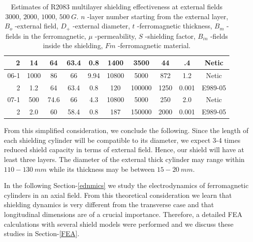 \documentclass[12pt]{article}
\begin{document}
\begin{table}[htbp]
\begin{center}
\begin{tabular}{|r|c|c|c|c|c|c|c|c|c|}
   2    & 14  & 64  & 63.4& 0.8  & 1400  & 3500       & 44   & .4               & Netic    \\ \hline \hline
 06-1    & 1000& 86  & 66  & 9.94 & 10800 & 5000       & 872  & 1.2    & Netic    \\ \hline
    2    & 1.2 & 64  & 63.4& 0.8  &  120  & 100000     & 1250 & 0.001  & E989-05  \\ \hline \hline
 07-1    & 500 & 74.6& 66  & 4.3  & 10800 & 5000       & 250  & 2.0    & Netic    \\ \hline
    2    & 2.0 & 60  & 58.4& 0.8  & 187   & 150000     & 2000 & 0.001  & E989-05  \\ \hline
\end{tabular}
\end{center}
\caption{Estimates of R2083 multilayer  shielding effectiveness at
 external fields  $3000$, $2000$, $1000$, $500~G$.
 $n$
-layer number starting from the external layer,
 $B_{o}$
-external field,
$D_+$
-external diameter,
$t$
-ferromagnetic thickness,
$B_m$
 -fields in the ferromagnetic, 
$\mu$
-permeability,
$S$
-shielding factor, 
$B_{in}$
-fields inside the shielding,
$Fm$
-ferromagnetic material.
\label{cal2}}
\end{table}
%

From this simplified consideration, we conclude the following.
Since the length of each shielding cylinder
will be compatible to its diameter, we expect 3-4 times reduced  
shield capacity in terms of external field.
Hence, our shield will  have  at least three layers.
The diameter of the external thick cylinder may  range within  
$110-130~mm$ while its thickness may be between $15-20~mm$.
 
In  the following Section-\ref{ednmics} we study the electrodynamics of  
ferromagnetic cylinders  in an axial field. From this theoretical 
consideration  we learn that shielding dynamics  is very  different from 
the transverse case and that longitudinal dimensions are of a crucial importance. 
Therefore, a detailed FEA calculations with several 
shield  models were performed and we discuss these studies in Section-\ref{FEA}.
\end{document}
